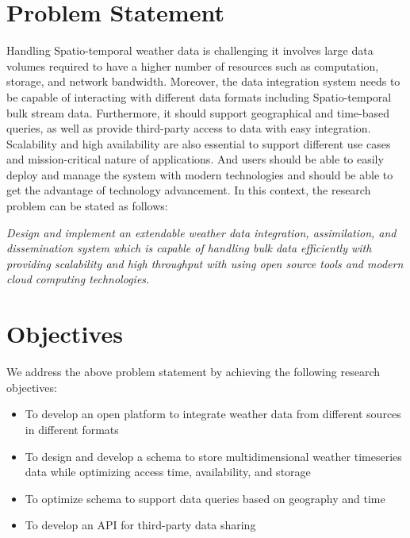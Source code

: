 \section{Problem Statement}
Handling Spatio-temporal weather data is challenging  it involves large data volumes required to have a higher number of resources such as computation, storage, and network bandwidth. Moreover, the data integration system needs to be capable of interacting with different data formats including Spatio-temporal bulk stream data. Furthermore, it should support geographical and time-based queries, as well as provide third-party access to data with easy integration. Scalability and high availability are also essential to support different use cases and mission-critical nature of applications.
And users should be able to easily deploy and manage the system with modern technologies and should be able to get the advantage of technology advancement. In this context, the research problem can be stated as follows:
 
\emph{Design and implement an extendable weather data integration, assimilation, and dissemination system which is capable of handling bulk data efficiently with providing scalability and high throughput with using open source tools and modern cloud computing technologies.}

\section{Objectives}
We address the above problem statement by achieving the following research objectives:
\begin{itemize}
    \item To develop an open platform to integrate weather data from different sources in different formats
    \item To design and develop a schema to store multidimensional weather timeseries data while optimizing access time, availability, and storage
    \item To optimize schema to support data queries based on geography and time
    \item To develop an API for third-party data sharing
\end{itemize}
